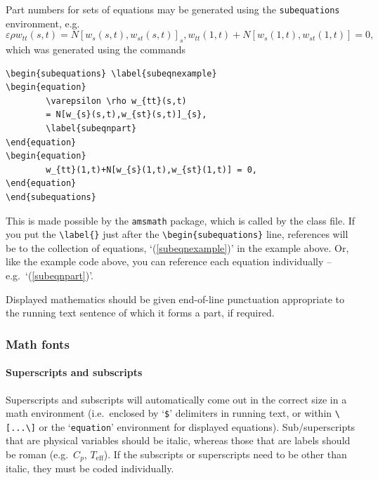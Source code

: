 \documentclass[]{interact}
\theoremstyle{plain}%
\theoremstyle{definition}
\theoremstyle{remark}
\begin{document}
Part numbers for sets of equations may be generated using the \texttt{subequations} environment, e.g.
\begin{subequations} \label{subeqnexample}
\begin{equation}
        \varepsilon \rho w_{tt}(s,t)
        = N[w_{s}(s,t),w_{st}(s,t)]_{s},
        \label{subeqnpart}
\end{equation}
\begin{equation}
        w_{tt}(1,t)+N[w_{s}(1,t),w_{st}(1,t)] = 0,
\end{equation}
\end{subequations}
which was generated using the commands
\begin{verbatim}
\begin{subequations} \label{subeqnexample}
\begin{equation}
        \varepsilon \rho w_{tt}(s,t)
        = N[w_{s}(s,t),w_{st}(s,t)]_{s},
        \label{subeqnpart}
\end{equation}
\begin{equation}
        w_{tt}(1,t)+N[w_{s}(1,t),w_{st}(1,t)] = 0,
\end{equation}
\end{subequations}
\end{verbatim}
This is made possible by the \texttt{amsmath} package, which is called by the class file. If you put the \verb"\label{}" just after the \verb"\begin{subequations}" line, references will be to the collection of equations, `(\ref{subeqnexample})' in the example above. Or, like the example code above, you can reference each equation individually -- e.g.\ `(\ref{subeqnpart})'.

Displayed mathematics should be given end-of-line punctuation appropriate to the running text sentence of which it forms a part, if required.

\subsubsection{Math fonts}

\paragraph{Superscripts and subscripts}
Superscripts and subscripts will automatically come out in the correct size in a math environment (i.e.\ enclosed by `\verb"$"' delimiters in running text, or within \verb"\[...\]" or the `\texttt{equation}' environment for displayed equations). Sub/superscripts that are physical variables should be italic, whereas those that are labels should be roman (e.g.\ $C_p$, $T_\mathrm{eff}$). If the subscripts or superscripts need to be other than italic, they must be coded individually.
\end{document}
